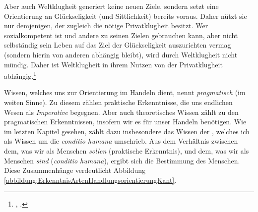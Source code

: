 Aber auch Weltklugheit generiert keine neuen Ziele, sondern setzt eine
Orientierung an Glückseligkeit (und Sittlichkeit) bereits voraus. Daher nützt
sie nur demjenigen, der zugleich die nötige Privatklugheit besitzt. Wer
sozialkompetent ist und andere zu seinen Zielen gebrauchen kann, aber nicht
selbständig sein Leben auf das Ziel der Glückseligkeit auszurichten vermag
(sondern hierin von anderen abhängig bleibt), wird durch Weltklugheit nicht
mündig. Daher ist Weltklugheit in ihrem Nutzen von der Privatklugheit
abhängig.\footnote{\cite[Vgl.][BA 42]{Kant:GrundlegungzurMetaphysikderSitten1965}, \cite[][IV:
416.34--37]{Kant:GesammelteWerke1900ff.}.}\label{Absatz:Weltklugheit-ENDE}


Wissen, welches uns zur Orientierung im Handeln dient, nennt
 \emph{pragmatisch} (im weiten Sinne). Zu diesem zählen 
praktische Erkenntnisse, die uns endlichen Wesen als \emph{Imperative} begegnen.
Aber auch theoretisches Wissen zählt zu den pragmatischen Erkenntnissen,
insofern wir es für unser Handeln benötigen. Wie im letzten Kapitel gesehen,
zählt dazu insbesondere das Wissen der , welches ich als Wissen um die \emph{conditio humana} umschrieb. Aus
dem Verhältnis zwischen dem, was wir als Menschen \emph{sollen} (praktische
Erkenntnis), und dem, was wir als Menschen \emph{sind} (\emph{conditio humana}),
ergibt sich die Bestimmung des Menschen. Diese Zusammenhänge verdeutlicht
Abbildung \ref{abbildung:ErkenntnisArtenHandlungsorientierungKant}.
